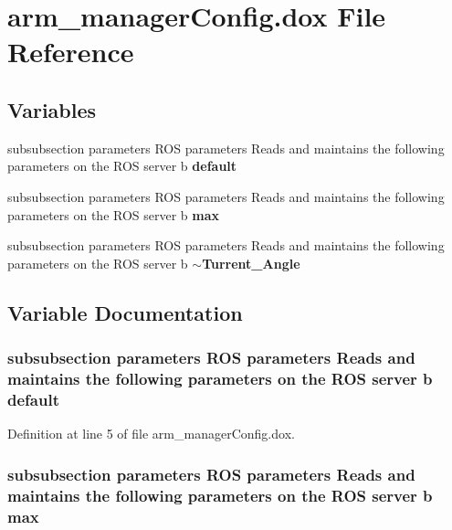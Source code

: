 \section{arm\-\_\-manager\-Config.\-dox \-File \-Reference}
\label{arm__managerConfig_8dox}
\subsection*{\-Variables}
\begin{DoxyCompactItemize}
\item 
subsubsection parameters \-R\-O\-S \*
parameters \-Reads and maintains \*
the following parameters on \*
the \-R\-O\-S server b {\bf default}
\item 
subsubsection parameters \-R\-O\-S \*
parameters \-Reads and maintains \*
the following parameters on \*
the \-R\-O\-S server b {\bf max}
\item 
subsubsection parameters \-R\-O\-S \*
parameters \-Reads and maintains \*
the following parameters on \*
the \-R\-O\-S server b {\bf $\sim$\-Turrent\-\_\-\-Angle}
\end{DoxyCompactItemize}


\subsection{\-Variable \-Documentation}
\subsubsection[{default}]{\setlength{\rightskip}{0pt plus 5cm}subsubsection parameters \-R\-O\-S parameters \-Reads and maintains the following parameters on the \-R\-O\-S server b {\bf default}}\label{arm__managerConfig_8dox_a94d02332ecf13e7845f06fe8c343e101}


\-Definition at line 5 of file arm\-\_\-manager\-Config.\-dox.

\subsubsection[{max}]{\setlength{\rightskip}{0pt plus 5cm}subsubsection parameters \-R\-O\-S parameters \-Reads and maintains the following parameters on the \-R\-O\-S server b {\bf max}}\label{arm__managerConfig_8dox_a55c9de72d9f3630abdf51bfe39c191dd}


